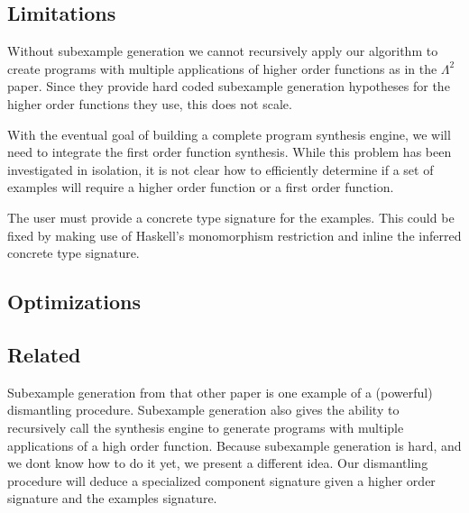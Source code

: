 \subsection{Limitations}

Without subexample generation we cannot recursively apply our algorithm to create programs with multiple applications of higher order functions as in the   $\Lambda^2$ paper\cite{isil}. Since they provide hard coded subexample generation hypotheses for the higher order functions they use, this does not scale.

With the eventual goal of building a complete program synthesis engine, we will need to integrate the first order function synthesis. While this problem has been investigated in isolation, it is not clear how to efficiently determine if  a set of examples will require a higher order function or a first order function.

The user must provide a concrete type signature for the examples. This could be fixed by making use of Haskell's monomorphism restriction and inline the inferred concrete type signature.

\subsection{Optimizations}

\subsection{Related}
Subexample generation from that other paper\cite{isil} is one example of a (powerful) dismantling procedure.
Subexample generation also gives the ability to recursively call the synthesis engine to generate programs with multiple applications of a high order function.
Because subexample generation is hard, and we dont know how to do it yet, we present a different idea.
Our dismantling procedure will deduce a specialized component signature given a higher order signature and the examples signature.